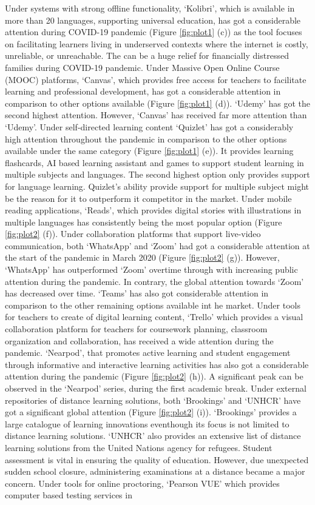 \documentclass[11pt,a4paper,]{article}
\begin{document}
Under systems with strong offline functionality, `Kolibri', which is available in more than 20 languages, supporting universal education, has got a considerable attention during COVID-19 pandemic (Figure \ref{fig:plot1} (c)) as the tool focuses on facilitating learners living in underserved contexts where the internet is costly, unreliable, or unreachable. The can be a huge relief for financially distressed families during COVID-19 pandemic. Under Massive Open Online Course (MOOC) platforms, `Canvas', which provides free access for teachers to facilitate learning and professional development, has got a considerable attention in comparison to other options available (Figure \ref{fig:plot1} (d)). `Udemy' has got the second highest attention. However, `Canvas' has received far more attention than `Udemy'. Under self-directed learning content `Quizlet' has got a considerably high attention throughout the pandemic in comparison to the other options available under the same category (Figure \ref{fig:plot1} (e)). It provides learning flashcards, AI based learning assistant and games to support student learning in multiple subjects and languages. The second highest option only provides support for language learning. Quizlet's ability provide support for multiple subject might be the reason for it to outperform it competitor in the market. Under mobile reading applications, `Reads', which provides digital stories with illustrations in multiple languages has consistently being the most popular option (Figure \ref{fig:plot2} (f)). Under collaboration platforms that support live-video communication, both `WhatsApp' and `Zoom' had got a considerable attention at the start of the pandemic in March 2020 (Figure \ref{fig:plot2} (g)). However, `WhatsApp' has outperformed `Zoom' overtime through with increasing public attention during the pandemic. In contrary, the global attention towards `Zoom' has decreased over time. `Teams' has also got considerable attention in comparison to the other remaining options available int he market. Under tools for teachers to create of digital learning content, `Trello' which provides a visual collaboration platform for teachers for coursework planning, classroom organization and collaboration, has received a wide attention during the pandemic. `Nearpod', that promotes active learning and student engagement through informative and interactive learning activities has also got a considerable attention during the pandemic (Figure \ref{fig:plot2} (h)). A significant peak can be observed in the `Nearpod' series, during the first academic break. Under external repositories of distance learning solutions, both `Brookings' and `UNHCR' have got a significant global attention (Figure \ref{fig:plot2} (i)). `Brookings' provides a large catalogue of learning innovations eventhough its focus is not limited to distance learning solutions. `UNHCR' also provides an extensive list of distance learning solutions from the United Nations agency for refugees. Student assessment is vital in ensuring the quality of education. However, due unexpected sudden school closure, administering examinations at a distance became a major concern. Under tools for online proctoring, `Pearson VUE' which provides computer based testing services in
\end{document}
